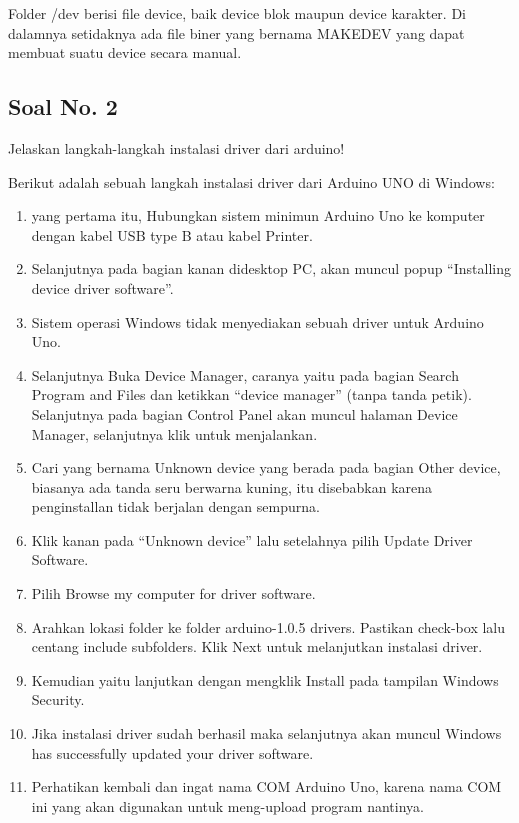 \hfill \break
Folder /dev berisi file device, baik device blok maupun device karakter. Di dalamnya setidaknya ada file biner yang bernama MAKEDEV yang dapat membuat suatu device secara manual.

\subsection{Soal No. 2}
Jelaskan langkah-langkah instalasi driver dari arduino!

\hfill \break
Berikut adalah sebuah langkah instalasi driver dari Arduino UNO di Windows:

\begin{enumerate}
	\item yang pertama itu, Hubungkan sistem minimun Arduino Uno ke komputer dengan kabel USB type B atau kabel Printer.
	\item Selanjutnya pada bagian kanan didesktop PC, akan muncul popup “Installing device driver software”.
	\item Sistem operasi Windows tidak menyediakan sebuah driver untuk Arduino Uno.
	\item Selanjutnya Buka Device Manager, caranya yaitu pada bagian Search Program and Files dan ketikkan “device manager” (tanpa tanda petik). Selanjutnya pada bagian Control Panel akan muncul halaman Device Manager, selanjutnya klik untuk menjalankan.
	\item Cari yang bernama Unknown device yang berada pada bagian Other device, biasanya ada tanda seru berwarna kuning, itu disebabkan karena penginstallan tidak berjalan dengan sempurna.
	\item Klik kanan pada “Unknown device” lalu setelahnya pilih Update Driver Software.
	\item Pilih Browse my computer for driver software.
	\item Arahkan lokasi folder ke folder arduino-1.0.5 drivers. Pastikan check-box lalu centang include subfolders. Klik Next untuk melanjutkan instalasi driver.
	\item Kemudian yaitu lanjutkan dengan mengklik Install pada tampilan Windows Security.
	\item Jika instalasi driver sudah berhasil maka selanjutnya akan muncul Windows has successfully updated your driver software.
	\item Perhatikan kembali dan ingat nama COM Arduino Uno, karena nama COM ini yang akan digunakan untuk meng-upload program nantinya.
\end{enumerate}

